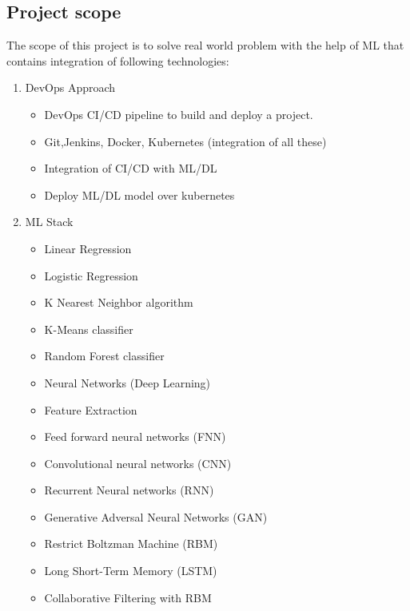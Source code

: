 \documentclass[12pt,oneside,a4paper]{report}
\begin{document}
\subsection{Project scope}
The scope of this project is to solve real world problem with the help of ML that contains integration of following technologies:
\begin{enumerate}
\item DevOps Approach
\begin{itemize}
\item    DevOps CI/CD pipeline to build and deploy a project.
\item    Git,Jenkins, Docker, Kubernetes (integration of all these)
\item    Integration of CI/CD with ML/DL
\item    Deploy ML/DL model over kubernetes
\end{itemize}
\item ML Stack
\begin{itemize}
\item Linear Regression
\item Logistic Regression
\item K Nearest Neighbor algorithm
\item K-Means classifier
\item Random Forest classifier
\item Neural Networks (Deep Learning)
\item Feature Extraction
\item Feed forward neural networks (FNN)
\item Convolutional neural networks (CNN)
\item Recurrent Neural networks (RNN)
\item Generative Adversal Neural Networks (GAN)
\item Restrict Boltzman Machine (RBM)
\item Long Short-Term Memory (LSTM)
\item Collaborative Filtering with RBM
\end{itemize}
\end{enumerate}

\newpage
\end{document}
